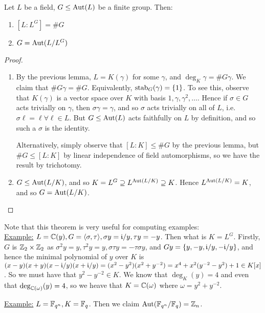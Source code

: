 \documentclass[10pt,a4paper]{article}
\begin{document}
\begin{theorem}[Artin]
Let $L$ be a field, $G \leq \operatorname{Aut}(L)$ be a finite group. Then:
\begin{enumerate}
\item $[L:L^G] = \#G$
\item $G = \operatorname{Aut}(L/L^G)$
\end{enumerate}
\end{theorem}
\begin{proof}\item
\begin{enumerate}
\item By the previous lemma, $L = K(\gamma)$ for some $\gamma$, and $\deg_K \gamma = \# G\gamma$. We claim that $\#G\gamma = \#G$. Equivalently, $\operatorname{stab}_G(\gamma) = \{1\}$. To see this, observe that $K(\gamma)$ is a vector space over $K$ with basis $1, \gamma, \gamma^2, \ldots$. Hence if $\sigma \in G$ acts trivially on $\gamma$, then $\sigma \gamma = \gamma$, and so $\sigma$ acts trivially on all of $L$, i.e. $\sigma\ell = \ell \forall \ell \in L$. But $G \leq \operatorname{Aut}(L)$ acts faithfully on $L$ by definition, and so such a $\sigma$ is the identity. 

Alternatively, simply observe that $[L:K]\leq \#G$ by the previous lemma, but $\#G \leq [L:K]$ by linear independence of field automorphisms, so we have the result by trichotomy.

\item $G \leq \operatorname{Aut}(L/K)$, and so $K = L^G \supseteq L^{\operatorname{Aut}(L/K)} \supseteq K$. Hence $L^{\operatorname{Aut}(L/K)} = K$, and so $G = \operatorname{Aut}(L/K)$. 
\end{enumerate}
\end{proof}

Note that this theorem is very useful for computing examples:\\
\underline{Example:} $L = \mathbb{C}(y), G = \langle \sigma, \tau \rangle, \sigma y = \mathfrak{i}/y, \tau y = -y$. Then what is $K = L^G$. Firstly, $G$ is $\mathbb{Z}_2 \times \mathbb{Z}_2$ as $\sigma^2 y = y, \tau^2 y = y, \sigma \tau y = -\tau\sigma y$, and $Gy = \{y,-y, \mathfrak{i}/y, -\mathfrak{i}/y\}$, and hence the minimal polynomial of $y$ over $K$ is $(x-y)(x+y)(x-\mathfrak{i}/y)(x+\mathfrak{i}/y) = (x^2-y^2)(x^2+y^{-2}) = x^4 + x^2 (y^{-2}-y^2) + 1 \in K[x]$. So we must have that $y^2 - y^{-2} \in K$. We know that $\deg_K(y) = 4$ and even that $\deg_{\mathbb{C}(\omega)}(y) = 4$, so we heave that $K = \mathbb{C}(\omega)$ where $\omega = y^2+y^{-2}$.

\underline{Example:} $L = \mathbb{F}_{q^n}, K = \mathbb{F}_q$. Then we claim $\operatorname{Aut}(\mathbb{F}_{q^n}/\mathbb{F}_q) = \mathbb{Z}_n$.
\end{document}

